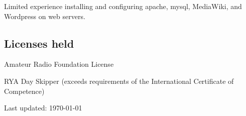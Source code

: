 \documentclass[letterpaper]{article}
\renewenvironment{itemize}{
  \begin{list}{}{
    \setlength{\leftmargin}{1.5em}
  }
}{
  \end{list}
}
\begin{document}
Limited experience installing and configuring apache, mysql, MediaWiki, and Wordpress on web servers.

\subsection*{Licenses held}
\begin{itemize}
\item Amateur Radio Foundation License
\item RYA Day Skipper (exceeds requirements of the International Certificate of Competence)
\end{itemize}


\bigskip

\begin{center}
\begin{footnotesize}
Last updated: \today \\
\end{footnotesize}
\end{center}
\end{document}
